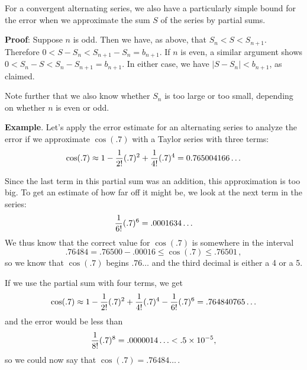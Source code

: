 {{{{For a convergent alternating
series, we also have a particularly simple bound for the error when we 
approximate the sum $S$ of the series by partial sums. 

\noindent
\begin{center}
\end{center}




{\bf Proof}:  Suppose $n$ is odd.  Then we have, as above, that $S_n<S<S_{n+1}$.  Therefore $0<S-S_n<S_{n+1}-S_n=b_{n+1}$.  If $n$ is even, a similar argument shows $0<S_n-S<S_n-S_{n+1}=b_{n+1}$.  In either case, we have $|S-S_n| < b_{n+1}$, as claimed.

Note further that we also know whether $S_n$ is too large or too small, depending on whether $n$ is even or odd.

\medskip



{\bf Example}.  Let's apply the error estimate 
for an alternating series
to analyze the error if we approximate $\cos(.7)$ with a Taylor series with three terms:
\[
\cos(.7) \approx        1 - {1 \over 2!} (.7)^2 
                + {1 \over 4!} (.7)^4
                = 0.765004166\ldots
\]

Since the last term in this partial sum was an addition, this approximation is too big.  To get an estimate of how far off it might be, we look at the next term in the series:
\[
{1 \over 6!} (.7)^6 = .0001634\ldots
\]
We thus know that the correct value for $\cos(.7)$ is somewhere in the interval
\[
.76484 = .76500 - .00016 \leq \cos(.7) \leq .76501 \, ,
\]
so we know that $\cos(.7)$ begins $.76\ldots$  and the third decimal is either a 4 or a 5.

If we use the partial sum with four terms, we get
\[
\cos(.7) \approx        1 - {1 \over 2!} (.7)^2 
                + {1 \over 4!} (.7)^4
                - {1 \over 6!} (.7)^6 
                = .764840765\ldots
\]
and the error would be less than
\[
{1 \over 8!}(.7)^8 = .0000014\ldots < .5 \times 10^{-5},
\]
so we could now say that $\cos(.7) =.76484\ldots \,$.

}}}}
